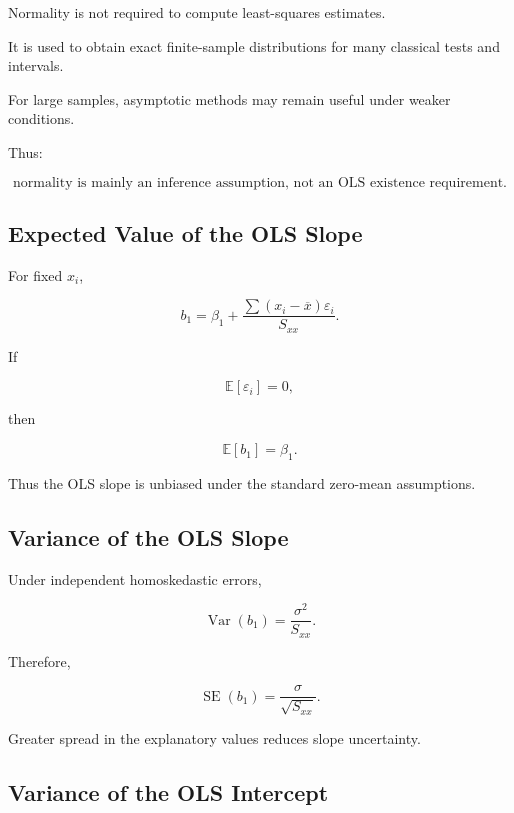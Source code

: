 Normality is not required to compute least-squares estimates.

It is used to obtain exact finite-sample distributions for many classical
tests and intervals.

For large samples, asymptotic methods may remain useful under weaker
conditions.

Thus:

\[
\boxed{
\text{normality is mainly an inference assumption, not an OLS existence
requirement}.
}
\]

\subsection{Expected Value of the OLS Slope}
\label{subsec:expected-ols-slope}

For fixed \(x_i\),

\[
b_1
=
\beta_1
+
\frac{
\sum
(x_i-\overline{x})\varepsilon_i
}{
S_{xx}
}.
\]

If

\[
\mathbb{E}[\varepsilon_i]=0,
\]

then

\[
\boxed{
\mathbb{E}[b_1]
=
\beta_1.
}
\]

Thus the OLS slope is unbiased under the standard zero-mean assumptions.

\subsection{Variance of the OLS Slope}
\label{subsec:variance-ols-slope}

Under independent homoskedastic errors,

\[
\boxed{
\operatorname{Var}(b_1)
=
\frac{
\sigma^2
}{
S_{xx}
}.
}
\]

Therefore,

\[
\boxed{
\operatorname{SE}(b_1)
=
\frac{
\sigma
}{
\sqrt{S_{xx}}
}.
}
\]

Greater spread in the explanatory values reduces slope uncertainty.

\subsection{Variance of the OLS Intercept}
\label{subsec:variance-ols-intercept}

